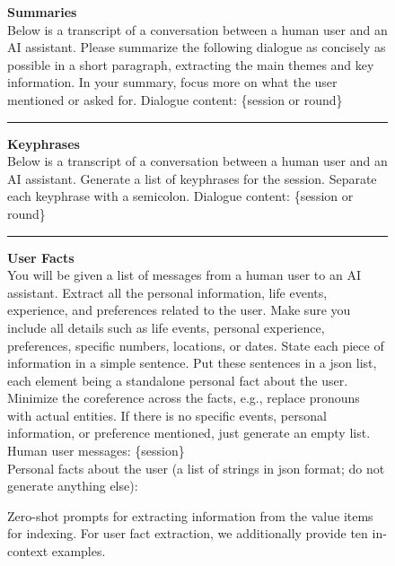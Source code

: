 
\begin{figure}[h]
    \begin{tcolorbox}
    \textbf{Summaries} \\

    Below is a transcript of a conversation between a human user and an AI assistant. Please summarize the following dialogue as concisely as possible in a short paragraph, extracting the main themes and key information. In your summary, focus more on what the user mentioned or asked for. Dialogue content: \{session or round\} \\

    \hrule
    \bigskip

    \textbf{Keyphrases} \\

    Below is a transcript of a conversation between a human user and an AI assistant. Generate a list of keyphrases for the session. Separate each keyphrase with a semicolon. Dialogue content: \{session or round\}
    \\

    \hrule
    \bigskip
    
    \textbf{User Facts} \\

    You will be given a list of messages from a human user to an AI assistant. Extract all the personal information, life events, experience, and preferences related to the user. Make sure you include all details such as life events, personal experience, preferences, specific numbers, locations, or dates. State each piece of information in a simple sentence. Put these sentences in a json list, each element being a standalone personal fact about the user. Minimize the coreference across the facts, e.g., replace pronouns with actual entities. If there is no specific events, personal information, or preference mentioned, just generate an empty list. \\
    
    Human user messages: \{session\} \\
    
    Personal facts about the user (a list of strings in json format; do not generate anything else): \\
    
    \end{tcolorbox}
    \caption{Zero-shot prompts for extracting information from the value items for indexing. For user fact extraction, we additionally provide ten in-context examples. }
    \label{fig:value-compression-prompt}
\end{figure}


